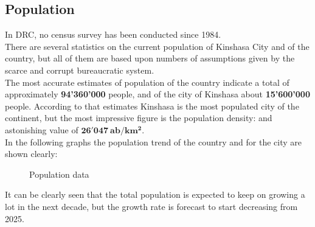 \documentclass{article}
\begin{document}
\subsection{Population}
In DRC, no census survey has been conducted since 1984. \\
There are several statistics on the current population of Kinshasa City and of the country, but all of them are based upon numbers of assumptions given by the scarce and corrupt bureaucratic system. \\
The most accurate estimates of population of the country indicate a total of approximately \textbf{94'360'000} people, and of the city of Kinshasa about \textbf{15'600'000} people.
According to that estimates Kinshasa is the most populated city of the continent, but the most impressive figure is the 
population density: and astonishing value of $ \boldsymbol{26'047\:ab/km^{2}} $.\\
\newpage
In the following graphs the population trend of the country and for the city are shown clearly:
\begin{figure}[H]
\centering
{}
\qquad
{}
\caption{Population data}
\end{figure}

It can be clearly seen that the total population is expected to keep on growing a lot in the next decade, but the growth rate is forecast to start decreasing from 2025.
\newpage
\end{document}
